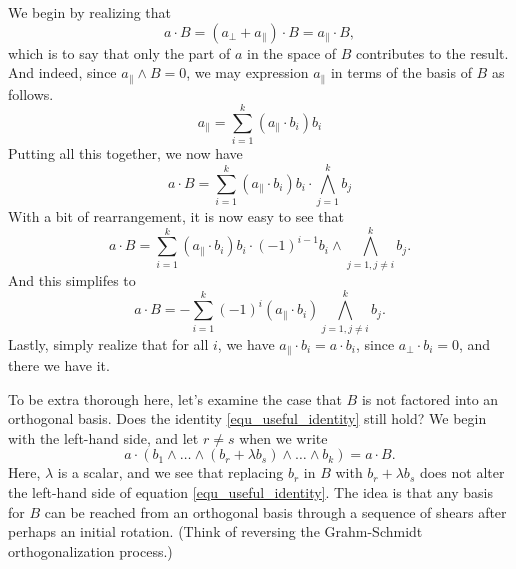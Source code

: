 \documentclass[12pt]{article}
\newcommand{\prl}{\parallel}
\newcommand{\prp}{\perp}
\begin{document}
We begin by realizing that
\begin{equation}
a\cdot B = (a_{\prp}+a_{\prl})\cdot B = a_{\prl}\cdot B,
\end{equation}
which is to say that only the part of $a$ in the space of $B$ contributes to the result.
And indeed, since $a_{\prl}\wedge B=0$, we may expression $a_{\prl}$ in terms
of the basis of $B$ as follows.
\begin{equation}
a_{\prl}=\sum_{i=1}^k (a_{\prl}\cdot b_i)b_i
\end{equation}
Putting all this together, we now have
\begin{equation}
a\cdot B = \sum_{i=1}^k (a_{\prl}\cdot b_i)b_i\cdot\bigwedge_{j=1}^k b_j
\end{equation}
With a bit of rearrangement, it is now easy to see that
\begin{equation}
a\cdot B = \sum_{i=1}^k (a_{\prl}\cdot b_i)b_i\cdot (-1)^{i-1}b_i\wedge\bigwedge_{j=1,j\neq i}^k b_j.
\end{equation}
And this simplifes to
\begin{equation}
a\cdot B = -\sum_{i=1}^k (-1)^i(a_{\prl}\cdot b_i)\bigwedge_{j=1,j\neq i}^k b_j.
\end{equation}
Lastly, simply realize that for all $i$, we have $a_{\prl}\cdot b_i=a\cdot b_i$, since $a_{\prp}\cdot b_i=0$,
and there we have it.

To be extra thorough here, let's examine the case that $B$ is not factored into an orthogonal basis.
Does the identity \eqref{equ_useful_identity} still hold?  We begin with the left-hand side, and
let $r\neq s$ when we write
\begin{equation}
a\cdot(b_1\wedge\dots\wedge(b_r+\lambda b_s)\wedge\dots\wedge b_k)=a\cdot B.
\end{equation}
Here, $\lambda$ is a scalar, and we see that replacing $b_r$ in $B$ with $b_r+\lambda b_s$ does not alter
the left-hand side of equation \eqref{equ_useful_identity}.  The idea is that any basis for $B$ can be reached from an orthogonal basis through
a sequence of shears after perhaps an initial rotation.  (Think of reversing the Grahm-Schmidt orthogonalization
process.)
\end{document}
